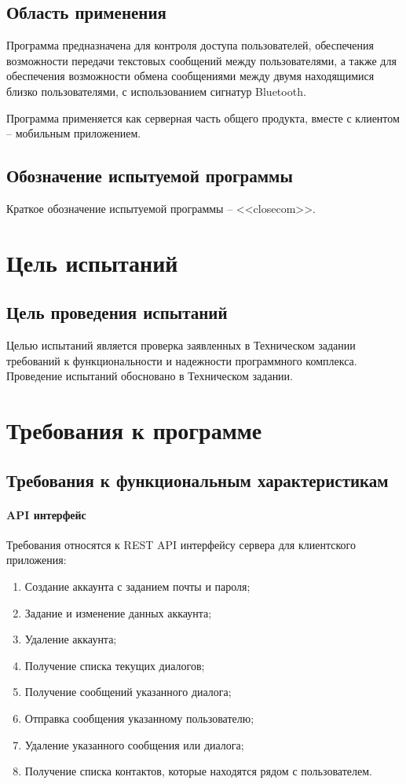 \documentclass[testmethods]{espd}
\begin{document}
\subsection{Область применения}
Программа предназначена для контроля доступа пользователей, обеспечения возможности передачи текстовых сообщений между пользователями, а также для обеспечения возможности обмена сообщениями между двумя находящимися близко пользователями, с использованием сигнатур Bluetooth.

Программа применяется как серверная часть общего продукта, вместе с клиентом -- мобильным приложением.

\subsection{Обозначение испытуемой программы}
Краткое обозначение испытуемой программы -- <<closecom>>.

\section{Цель испытаний}
\subsection{Цель проведения испытаний}
Целью испытаний является проверка заявленных в Техническом задании требований к функциональности и надежности программного комплекса. Проведение испытаний обосновано в Техническом задании.

\section{Требования к программе}
\subsection{Требования к функциональным характеристикам}
\paragraph{API интерфейс}
Требования относятся к REST API интерфейсу сервера для клиентского приложения:

\begin{enumerate}
\item Создание аккаунта с заданием почты и пароля;
\item Задание и изменение данных аккаунта;
\item Удаление аккаунта;
\item Получение списка текущих диалогов;
\item Получение сообщений указанного диалога;
\item Отправка сообщения указанному пользователю;
\item Удаление указанного сообщения или диалога;
\item Получение списка контактов, которые находятся рядом с пользователем.
\end{enumerate}
\end{document}

